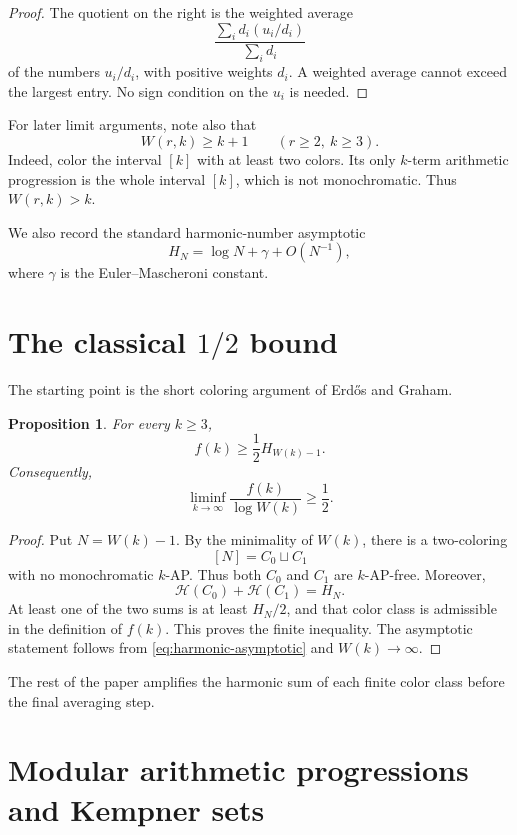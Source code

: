 \documentclass[11pt]{article}
\newtheorem{proposition}[theorem]{Proposition}
\theoremstyle{definition}
\theoremstyle{remark}
\newcommand{\HH}{\mathcal{H}}
\begin{document}
\begin{proof}
The quotient on the right is the weighted average
\[
 \frac{\sum_i d_i(u_i/d_i)}{\sum_i d_i}
\]
of the numbers $u_i/d_i$, with positive weights $d_i$.  A weighted average
cannot exceed the largest entry.  No sign condition on the $u_i$ is needed.
\end{proof}

For later limit arguments, note also that
\begin{equation}\label{eq:W-elementary-growth}
 W(r,k)\ge k+1
 \qquad (r\ge2,\ k\ge3).
\end{equation}
Indeed, color the interval $[k]$ with at least two colors.  Its only
$k$-term arithmetic progression is the whole interval $[k]$, which is not
monochromatic.  Thus $W(r,k)>k$.

We also record the standard harmonic-number asymptotic
\begin{equation}\label{eq:harmonic-asymptotic}
 H_N=\log N+\gamma+O(N^{-1}),
\end{equation}
where $\gamma$ is the Euler--Mascheroni constant.

\section{The classical \texorpdfstring{$1/2$}{1/2} bound}

The starting point is the short coloring argument of Erd\H{o}s and Graham.

\begin{proposition}\label{prop:classical-half}
For every $k\ge 3$,
\[
 f(k)\ge \frac12 H_{W(k)-1}.
\]
Consequently,
\[
 \liminf_{k\to\infty}\frac{f(k)}{\log W(k)}\ge\frac12.
\]
\end{proposition}

\begin{proof}
Put $N=W(k)-1$.  By the minimality of $W(k)$, there is a two-coloring
\[
 [N]=C_0\sqcup C_1
\]
with no monochromatic $k$-AP.  Thus both $C_0$ and $C_1$ are $k$-AP-free.
Moreover,
\[
 \HH(C_0)+\HH(C_1)=H_N.
\]
At least one of the two sums is at least $H_N/2$, and that color class is
admissible in the definition of $f(k)$.  This proves the finite inequality.
The asymptotic statement follows from \cref{eq:harmonic-asymptotic} and
$W(k)\to\infty$.
\end{proof}

The rest of the paper amplifies the harmonic sum of each finite color class
before the final averaging step.

\section{Modular arithmetic progressions and Kempner sets}
\end{document}
